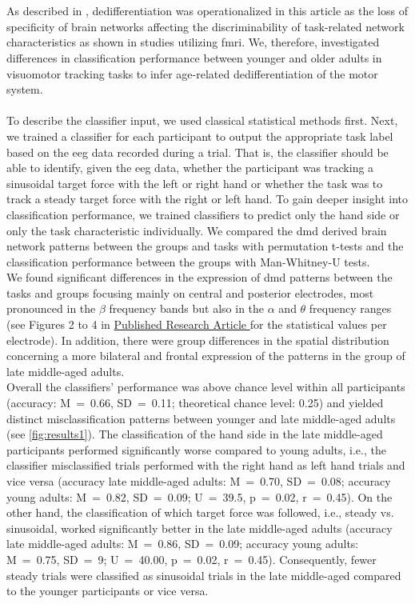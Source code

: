 \hyperref[pub:paperI]{}\\
\\
As described in , dedifferentiation was operationalized in this article as the loss of specificity of brain networks affecting the discriminability of task-related network characteristics as shown in studies utilizing \gls{fmri}. We, therefore, investigated differences in classification performance between younger and older adults in visuomotor tracking tasks to infer age-related dedifferentiation of the motor system.\\
\\
To describe the classifier input, we used classical statistical methods first. Next, we trained a classifier for each participant to output the appropriate task label based on the \gls{eeg} data recorded during a trial. That is, the classifier should be able to identify, given the \gls{eeg} data, whether the participant was tracking a sinusoidal target force with the left or right hand or whether the task was to track a steady target force with the right or left hand. To gain deeper insight into classification performance, we trained classifiers to predict only the hand side or only the task characteristic individually. We compared the \gls{dmd} derived brain network patterns between the groups and tasks with permutation t-tests and the classification performance between the groups with Man-Whitney-U tests.\\
\newpage
\noindent We found significant differences in the expression of \gls{dmd} patterns between the tasks and groups focusing mainly on central and posterior electrodes, most pronounced in the $\beta$ frequency bands but also in the $\alpha$ and $\theta$ frequency ranges (see Figures 2 to 4 in \hyperref[pub:paperI]{Published Research Article } for the statistical values per electrode). In addition, there were group differences in the spatial distribution concerning a more bilateral and frontal expression of the patterns in the group of late middle-aged adults.\\
Overall the classifiers' performance was above chance level within all participants (accuracy: M~=~0.66, SD~=~0.11; theoretical chance level: 0.25) and yielded distinct misclassification patterns between younger and late middle-aged adults (see \autoref{fig:results1}). The classification of the hand side in the late middle-aged participants performed significantly worse compared to young adults, i.e., the classifier misclassified trials performed with the right hand as left hand trials and vice versa (accuracy late middle-aged adults: M~=~0.70, SD~=~0.08; accuracy young adults: M~=~0.82, SD~=~0.09; U~=~39.5, p~=~0.02, r~=~0.45). On the other hand, the classification of which target force was followed, i.e., steady vs. sinusoidal, worked significantly better in the late middle-aged adults (accuracy late middle-aged adults: M~=~0.86, SD~=~0.09; accuracy young adults: M~=~0.75, SD~=~9; U~=~40.00, p~=~0.02, r~=~0.45). Consequently, fewer steady trials were classified as sinusoidal trials in the late middle-aged compared to the younger participants or vice versa.


